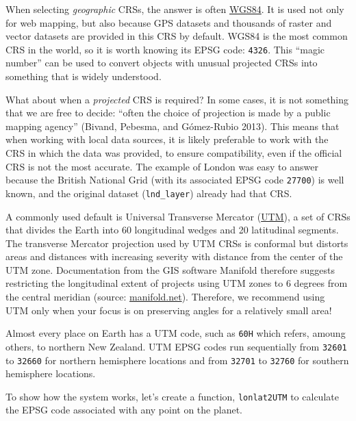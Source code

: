 \documentclass[
  letterpaper,
]{krantz}
\begin{document}
When selecting \emph{geographic} CRSs, the answer is often
\href{https://en.wikipedia.org/wiki/World_Geodetic_System\#A_new_World_Geodetic_System:_WGS_84}{WGS84}.
It is used not only for web mapping, but also because GPS datasets and
thousands of raster and vector datasets are provided in this CRS by
default. WGS84 is the most common CRS in the world, so it is worth
knowing its EPSG code: \texttt{4326}. This ``magic number'' can be used
to convert objects with unusual projected CRSs into something that is
widely understood.

What about when a \emph{projected} CRS is required? In some cases, it is
not something that we are free to decide: ``often the choice of
projection is made by a public mapping agency'' (Bivand, Pebesma, and
Gómez-Rubio 2013). This means that when working with local data sources,
it is likely preferable to work with the CRS in which the data was
provided, to ensure compatibility, even if the official CRS is not the
most accurate. The example of London was easy to answer because the
British National Grid (with its associated EPSG code \texttt{27700}) is
well known, and the original dataset (\texttt{lnd\_layer}) already had
that CRS.

A commonly used default is Universal Transverse Mercator
(\href{https://en.wikipedia.org/wiki/Universal_Transverse_Mercator_coordinate_system}{UTM}),
a set of CRSs that divides the Earth into 60 longitudinal wedges and 20
latitudinal segments. The transverse Mercator projection used by UTM
CRSs is conformal but distorts areas and distances with increasing
severity with distance from the center of the UTM zone. Documentation
from the GIS software Manifold therefore suggests restricting the
longitudinal extent of projects using UTM zones to 6 degrees from the
central meridian (source:
\href{http://www.manifold.net/doc/mfd9/universal_transverse_mercator_projection.htm}{manifold.net}).
Therefore, we recommend using UTM only when your focus is on preserving
angles for a relatively small area!

Almost every place on Earth has a UTM code, such as
\texttt{\textquotesingle{}60H\textquotesingle{}} which refers, amoung
others, to northern New Zealand. UTM EPSG codes run sequentially from
\texttt{32601} to \texttt{32660} for northern hemisphere locations and
from \texttt{32701} to \texttt{32760} for southern hemisphere locations.

To show how the system works, let's create a function,
\texttt{lonlat2UTM} to calculate the EPSG code associated with any point
on the planet.
\end{document}
